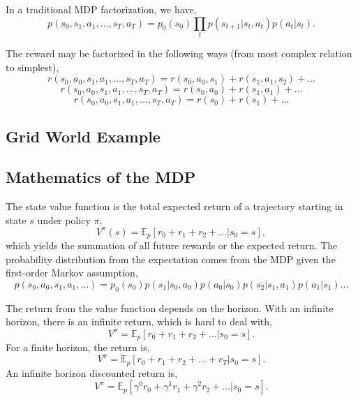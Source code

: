 \documentclass[11pt]{article}
\begin{document}
In a traditional MDP factorization, we have,
\begin{equation*}
p(s_0, s_1, a_1, \dots, s_T, a_T) = p_0(s_0) \prod_{t} p(s_{t+1} | s_t, a_t) p(a_t|s_t).    
\end{equation*}

The reward may be factorized in the following ways (from most complex relation to simplest),
$$
r(s_0,a_0,s_1,a_1,\dots,s_T,a_T) = r(s_0,a_0,s_1) + r(s_1,a_1,s_2) + \dots
$$
$$
r(s_0,a_0,s_1,a_1,\dots,s_T,a_T) = r(s_0,a_0) + r(s_1,a_1) + \dots
$$
$$
r(s_0,a_0,s_1,a_1,\dots,s_T,a_T) = r(s_0) + r(s_1) + \dots
$$

\subsection{Grid World Example}

\subsection{Mathematics of the MDP}
The state value function is the total expected return of a trajectory starting in state $s$ under policy $\pi$,
$$
V^\pi (s) = \mathds{E}_p [r_0 + r_1 + r_2 + \dots | s_0 = s],
$$
which yields the summation of all future rewards or the expected return. The probability distribution from the expectation comes from the MDP given the first-order Markov assumption,
$$
p(s_0,a_0,s_1,a_1,\dots) = p_0 (s_0) p(s_1 | s_0, a_0) p(a_0 | s_0) p(s_2| s_1, a_1) p(a_1 | s_1) \dots
$$

The return from the value function depends on the horizon. With an infinite horizon, there is an infinite return, which is hard to deal with,
$$
V^\pi = \mathds{E}_p [r_0 + r_1 + r_2 + \dots | s_0 = s].
$$
For a finite horizon, the return is,
$$
V^\pi = \mathds{E}_p [r_0 + r_1 + r_2 + \dots + r_T | s_0 = s].
$$
An infinite horizon discounted return is,
$$
V^\pi = \mathds{E}_p [\gamma^0 r_0 + \gamma^1 r_1 + \gamma^2 r_2 + \dots | s_0 = s].
$$
\end{document}
